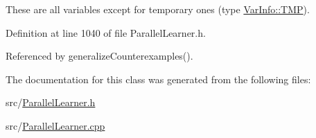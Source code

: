 These are all variables except for temporary ones (type \hyperlink{classVarInfo_a64d1da76cf84fe674e5fef9764ef11cfa84a2d8d86f004930fe564dc5b395b29f}{Var\-Info\-::\-T\-M\-P}). 

Definition at line 1040 of file Parallel\-Learner.\-h.



Referenced by generalize\-Counterexamples().



The documentation for this class was generated from the following files\-:\begin{DoxyCompactItemize}
\item 
src/\hyperlink{ParallelLearner_8h}{Parallel\-Learner.\-h}\item 
src/\hyperlink{ParallelLearner_8cpp}{Parallel\-Learner.\-cpp}\end{DoxyCompactItemize}
